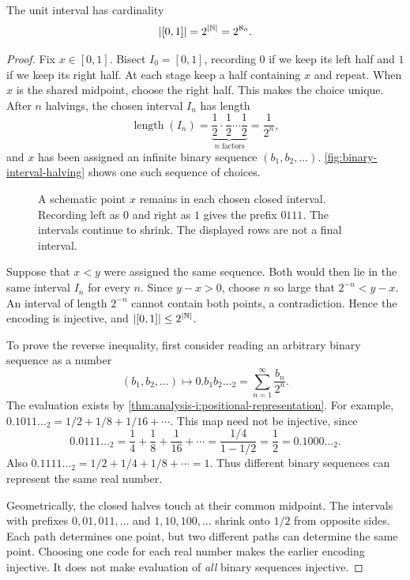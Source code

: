 \begin{proposition}
  \label{thm:analysis-i:binary-interval-cardinality}
  The unit interval has cardinality
  \[
    |[0,1]|=2^{|\mathbb{N}|}=2^{\aleph_0}.
  \]
\end{proposition}
\begin{proof}
  Fix $x\in[0,1]$. Bisect $I_0=[0,1]$, recording $0$ if we keep its
  left half and $1$ if we keep its right half. At each stage keep a
  half containing $x$ and repeat.
  When $x$ is the shared midpoint, choose the right
  half. This makes the choice unique.
  After $n$ halvings, the chosen interval $I_n$ has length
  \[
    \operatorname{length}(I_n)
      =\underbrace{\frac12\cdot\frac12\cdots\frac12}_{n\text{ factors}}
      =\frac1{2^n},
  \]
  and $x$ has been assigned an infinite binary
  sequence $(b_1,b_2,\ldots)$.
  \autoref{fig:binary-interval-halving} shows one such
  sequence of choices.

  \begin{figure}[htbp]
    \centering
    
    \caption[Encoding a point by interval halving.]{A
      schematic point $x$ remains in each chosen closed interval.
      Recording left as $0$ and right as $1$ gives the prefix $0111$.
      The intervals continue to shrink. The displayed rows are not
      a final interval.}
    \label{fig:binary-interval-halving}
  \end{figure}

  Suppose that $x<y$ were assigned the same sequence. Both would then
  lie in the same interval $I_n$ for every $n$. Since $y-x>0$, choose
  $n$ so large that $2^{-n}<y-x$. An interval of length $2^{-n}$ cannot
  contain both points, a contradiction. Hence the encoding is injective,
  and $|[0,1]|\le2^{|\mathbb{N}|}$.

  To prove the reverse inequality, first consider reading an arbitrary
  binary sequence as a number
  \[
    (b_1,b_2,\ldots)\longmapsto
    0.b_1b_2\ldots{}_2=\sum_{n=1}^{\infty}\frac{b_n}{2^n}.
  \]
  The evaluation exists by
  \autoref{thm:analysis-i:positional-representation}.
  For example, $0.1011\ldots{}_2=1/2+1/8+1/16+\cdots$.
  This map need not be injective, since
  \[
    0.0111\ldots{}_2
      =\frac14+\frac18+\frac1{16}+\cdots
      =\frac{1/4}{1-1/2}=\frac12
      =0.1000\ldots{}_2.
  \]
  Also $0.1111\ldots{}_2=1/2+1/4+1/8+\cdots=1$. Thus different binary
  sequences can represent the same real number.


  Geometrically, the closed halves touch at their common midpoint.
  The intervals with prefixes $0,01,011,\ldots$ and $1,10,100,\ldots$
  shrink onto $1/2$ from opposite sides. Each path determines one point,
  but two different paths can determine the same point. Choosing one
  code for each real number makes the earlier encoding injective.
  It does not make evaluation of \emph{all} binary sequences injective.



\end{proof}
